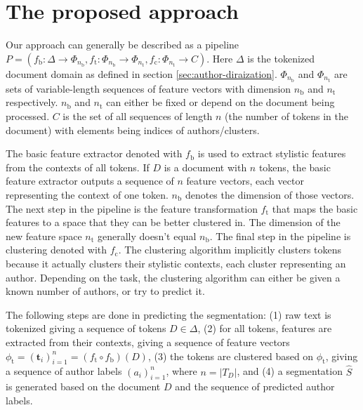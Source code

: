 \documentclass[10pt, a4paper]{article}
\newcommand{\vect}[1]{\bm{#1}}
\begin{document}
\section{The proposed approach} \label{sec:the-proposed-approach}

Our approach can generally be described as a pipeline $P = (f_\mathrm{b}:\Delta\rightarrow \Phi_{n_\mathrm{b}}, f_\mathrm{t}:\Phi_{n_\mathrm{b}}\rightarrow \Phi_{n_\mathrm{t}}, f_\mathrm{c}:\Phi_{n_\mathrm{t}}\rightarrow C)$. Here $\Delta$ is the tokenized document domain as defined in section \ref{sec:author-diraization}. $\Phi_{n_\mathrm{b}}$ and $\Phi_{n_\mathrm{t}}$ are sets of variable-length sequences of feature vectors with dimension $n_\mathrm{b}$ and $n_\mathrm{t}$ respectively. $n_\mathrm{b}$ and $n_\mathrm{t}$ can either be fixed or depend on the document being processed. $C$ is the set of all sequences of length $n$ (the number of tokens in the document) with elements being indices of authors/clusters.

The basic feature extractor denoted with $f_\mathrm{b}$ is used to extract stylistic features from the contexts of all tokens. If $D$ is a document with $n$ tokens, the basic feature extractor outputs a sequence of $n$ feature vectors, each vector representing the context of one token. $n_\mathrm{b}$ denotes the dimension of those vectors. The next step in the pipeline is the feature transformation $f_\mathrm{t}$ that maps the basic features to a space that they can be better clustered in. The dimension of the new feature space $n_\mathrm{t}$ generally doesn't equal $n_\mathrm{b}$. The final step in the pipeline is clustering denoted with $f_\mathrm{c}$. The clustering algorithm implicitly clusters tokens because it actually clusters their stylistic contexts, each cluster representing an author. Depending on the task, the clustering algorithm can either be given a known number of authors, or try to predict it.

The following steps are done in predicting the segmentation: (1) raw text is tokenized giving a sequence of tokens $D\in\Delta$, (2) for all tokens, features are extracted from their contexts, giving a sequence of feature vectors $\phi_\mathrm{t} = (\vect{t}_i)_{i=1}^n = (f_\mathrm{t}\circ f_\mathrm{b})(D)$, (3) the tokens are clustered based on $\phi_\mathrm{t}$, giving a sequence of author labels $(a_i)_{i=1}^{n}$, where $n=|T_D|$, and (4) a segmentation $\hat{S}$ is generated based on the document $D$ and the sequence of predicted author labels.
\end{document}
